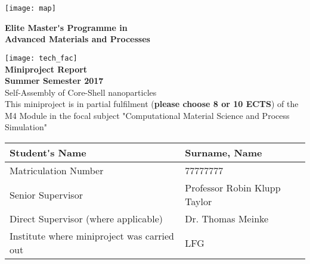 \begin{titlepage}



\noindent%
\texttt{[image: map]}%
\begin{minipage}[b]{0.5\textwidth}
\centering
\textbf{Elite Master\'{}s Programme in} \\
\textbf{Advanced Materials and Processes}
\end{minipage}%
\texttt{[image: tech\_fac]}
\\[4mm]
\centering
\textbf{Miniproject Report}
\\[2mm]
\textbf{Summer Semester 2017}
\\[4mm]
\LARGE{Self-Assembly of Core-Shell nanoparticles}
\\[6mm]
\Large{This miniproject is in partial fulfilment (\textbf{please choose 8 or  
10
ECTS}) of the M4 Module in the focal 
subject "Computational Material Science and Process Simulation"}   
\\[4mm]
\begin{centering}
\begin{tabularx}{\textwidth}{|Z|Y|}
\hline
  {\normalsize Student\'{}s Name} & 
  {\large Surname, Name}
\\
\hline
  {\normalsize Matriculation Number} &
  {\large 77777777}
\\
\hline
  {\normalsize Senior Supervisor} & 
  {\large Professor Robin Klupp Taylor}
\\
\hline
 {\normalsize Direct Supervisor (where
applicable)} & 
  {\large Dr. Thomas Meinke}
\\
\hline
{\normalsize Institute where miniproject
was carried out} &
  {\large LFG}
\\
\hline
\end{tabularx}
\end{centering}






\end{titlepage}
